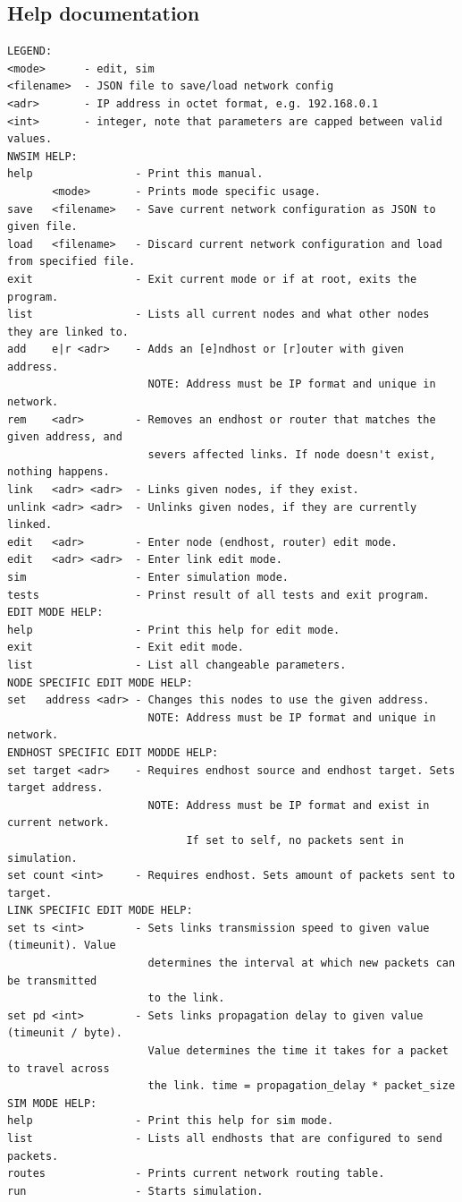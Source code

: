 \subsection{Help documentation} \label{sec:help}
\lstset{basicstyle=\scriptsize}
\begin{lstlisting}
LEGEND:
<mode>      - edit, sim
<filename>  - JSON file to save/load network config
<adr>       - IP address in octet format, e.g. 192.168.0.1
<int>       - integer, note that parameters are capped between valid values.
NWSIM HELP:
help                - Print this manual.
       <mode>       - Prints mode specific usage.
save   <filename>   - Save current network configuration as JSON to given file.
load   <filename>   - Discard current network configuration and load from specified file.
exit                - Exit current mode or if at root, exits the program.
list                - Lists all current nodes and what other nodes they are linked to.
add    e|r <adr>    - Adds an [e]ndhost or [r]outer with given address.
                      NOTE: Address must be IP format and unique in network.
rem    <adr>        - Removes an endhost or router that matches the given address, and
                      severs affected links. If node doesn't exist, nothing happens.
link   <adr> <adr>  - Links given nodes, if they exist.
unlink <adr> <adr>  - Unlinks given nodes, if they are currently linked.
edit   <adr>        - Enter node (endhost, router) edit mode.
edit   <adr> <adr>  - Enter link edit mode.
sim                 - Enter simulation mode.
tests               - Prinst result of all tests and exit program.
EDIT MODE HELP:
help                - Print this help for edit mode.
exit                - Exit edit mode.
list                - List all changeable parameters.
NODE SPECIFIC EDIT MODE HELP:
set   address <adr> - Changes this nodes to use the given address.
                      NOTE: Address must be IP format and unique in network.
ENDHOST SPECIFIC EDIT MODDE HELP:
set target <adr>    - Requires endhost source and endhost target. Sets target address.
                      NOTE: Address must be IP format and exist in current network.
                            If set to self, no packets sent in simulation.
set count <int>     - Requires endhost. Sets amount of packets sent to target.
LINK SPECIFIC EDIT MODE HELP:
set ts <int>        - Sets links transmission speed to given value (timeunit). Value 
                      determines the interval at which new packets can be transmitted
                      to the link.
set pd <int>        - Sets links propagation delay to given value (timeunit / byte).
                      Value determines the time it takes for a packet to travel across
                      the link. time = propagation_delay * packet_size
SIM MODE HELP:
help                - Print this help for sim mode.
list                - Lists all endhosts that are configured to send packets.
routes              - Prints current network routing table.
run                 - Starts simulation.
\end{lstlisting}

